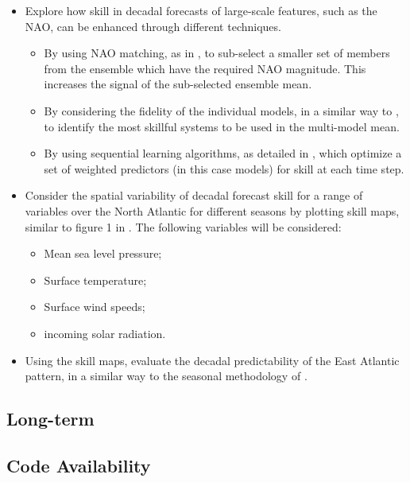 \documentclass{article}
\begin{document}
\begin{itemize}
    \item Explore how skill in decadal forecasts of large-scale features, such as the NAO, can be enhanced through different techniques.
    \begin{itemize}
        \item By using NAO matching, as in \cite{smith2020north}, to sub-select a smaller set of members from the ensemble which have the required NAO magnitude. This increases the signal of the sub-selected ensemble mean.
        \item By considering the fidelity of the individual models, in a similar way to \cite{gonzalez2016long}, to identify the most skillful systems to be used in the multi-model mean.
        \item By using sequential learning algorithms, as detailed in \cite{gonzalez2021new}, which optimize a set of weighted predictors (in this case models) for skill at each time step.
    \end{itemize}
    \item Consider the spatial variability of decadal forecast skill for a range of variables over the North Atlantic for different seasons by plotting skill maps, similar to figure 1 in \cite{smith2020north}. The following variables will be considered:
    \begin{itemize}
        \item Mean sea level pressure;
        \item Surface temperature;
        \item Surface wind speeds;
        \item incoming solar radiation.
    \end{itemize}
    \item Using the skill maps, evaluate the decadal predictability of the East Atlantic pattern, in a similar way to the seasonal methodology of \cite{thornton2023seasonal}.
\end{itemize}

\subsection{Long-term}

\subsection*{Code Availability}
\end{document}
